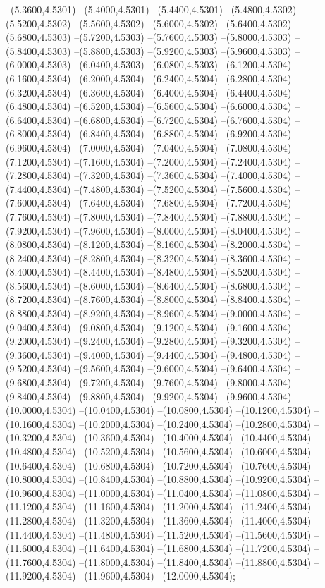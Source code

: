 {	--(5.3600,4.5301)
	--(5.4000,4.5301)
	--(5.4400,4.5301)
	--(5.4800,4.5302)
	--(5.5200,4.5302)
	--(5.5600,4.5302)
	--(5.6000,4.5302)
	--(5.6400,4.5302)
	--(5.6800,4.5303)
	--(5.7200,4.5303)
	--(5.7600,4.5303)
	--(5.8000,4.5303)
	--(5.8400,4.5303)
	--(5.8800,4.5303)
	--(5.9200,4.5303)
	--(5.9600,4.5303)
	--(6.0000,4.5303)
	--(6.0400,4.5303)
	--(6.0800,4.5303)
	--(6.1200,4.5304)
	--(6.1600,4.5304)
	--(6.2000,4.5304)
	--(6.2400,4.5304)
	--(6.2800,4.5304)
	--(6.3200,4.5304)
	--(6.3600,4.5304)
	--(6.4000,4.5304)
	--(6.4400,4.5304)
	--(6.4800,4.5304)
	--(6.5200,4.5304)
	--(6.5600,4.5304)
	--(6.6000,4.5304)
	--(6.6400,4.5304)
	--(6.6800,4.5304)
	--(6.7200,4.5304)
	--(6.7600,4.5304)
	--(6.8000,4.5304)
	--(6.8400,4.5304)
	--(6.8800,4.5304)
	--(6.9200,4.5304)
	--(6.9600,4.5304)
	--(7.0000,4.5304)
	--(7.0400,4.5304)
	--(7.0800,4.5304)
	--(7.1200,4.5304)
	--(7.1600,4.5304)
	--(7.2000,4.5304)
	--(7.2400,4.5304)
	--(7.2800,4.5304)
	--(7.3200,4.5304)
	--(7.3600,4.5304)
	--(7.4000,4.5304)
	--(7.4400,4.5304)
	--(7.4800,4.5304)
	--(7.5200,4.5304)
	--(7.5600,4.5304)
	--(7.6000,4.5304)
	--(7.6400,4.5304)
	--(7.6800,4.5304)
	--(7.7200,4.5304)
	--(7.7600,4.5304)
	--(7.8000,4.5304)
	--(7.8400,4.5304)
	--(7.8800,4.5304)
	--(7.9200,4.5304)
	--(7.9600,4.5304)
	--(8.0000,4.5304)
	--(8.0400,4.5304)
	--(8.0800,4.5304)
	--(8.1200,4.5304)
	--(8.1600,4.5304)
	--(8.2000,4.5304)
	--(8.2400,4.5304)
	--(8.2800,4.5304)
	--(8.3200,4.5304)
	--(8.3600,4.5304)
	--(8.4000,4.5304)
	--(8.4400,4.5304)
	--(8.4800,4.5304)
	--(8.5200,4.5304)
	--(8.5600,4.5304)
	--(8.6000,4.5304)
	--(8.6400,4.5304)
	--(8.6800,4.5304)
	--(8.7200,4.5304)
	--(8.7600,4.5304)
	--(8.8000,4.5304)
	--(8.8400,4.5304)
	--(8.8800,4.5304)
	--(8.9200,4.5304)
	--(8.9600,4.5304)
	--(9.0000,4.5304)
	--(9.0400,4.5304)
	--(9.0800,4.5304)
	--(9.1200,4.5304)
	--(9.1600,4.5304)
	--(9.2000,4.5304)
	--(9.2400,4.5304)
	--(9.2800,4.5304)
	--(9.3200,4.5304)
	--(9.3600,4.5304)
	--(9.4000,4.5304)
	--(9.4400,4.5304)
	--(9.4800,4.5304)
	--(9.5200,4.5304)
	--(9.5600,4.5304)
	--(9.6000,4.5304)
	--(9.6400,4.5304)
	--(9.6800,4.5304)
	--(9.7200,4.5304)
	--(9.7600,4.5304)
	--(9.8000,4.5304)
	--(9.8400,4.5304)
	--(9.8800,4.5304)
	--(9.9200,4.5304)
	--(9.9600,4.5304)
	--(10.0000,4.5304)
	--(10.0400,4.5304)
	--(10.0800,4.5304)
	--(10.1200,4.5304)
	--(10.1600,4.5304)
	--(10.2000,4.5304)
	--(10.2400,4.5304)
	--(10.2800,4.5304)
	--(10.3200,4.5304)
	--(10.3600,4.5304)
	--(10.4000,4.5304)
	--(10.4400,4.5304)
	--(10.4800,4.5304)
	--(10.5200,4.5304)
	--(10.5600,4.5304)
	--(10.6000,4.5304)
	--(10.6400,4.5304)
	--(10.6800,4.5304)
	--(10.7200,4.5304)
	--(10.7600,4.5304)
	--(10.8000,4.5304)
	--(10.8400,4.5304)
	--(10.8800,4.5304)
	--(10.9200,4.5304)
	--(10.9600,4.5304)
	--(11.0000,4.5304)
	--(11.0400,4.5304)
	--(11.0800,4.5304)
	--(11.1200,4.5304)
	--(11.1600,4.5304)
	--(11.2000,4.5304)
	--(11.2400,4.5304)
	--(11.2800,4.5304)
	--(11.3200,4.5304)
	--(11.3600,4.5304)
	--(11.4000,4.5304)
	--(11.4400,4.5304)
	--(11.4800,4.5304)
	--(11.5200,4.5304)
	--(11.5600,4.5304)
	--(11.6000,4.5304)
	--(11.6400,4.5304)
	--(11.6800,4.5304)
	--(11.7200,4.5304)
	--(11.7600,4.5304)
	--(11.8000,4.5304)
	--(11.8400,4.5304)
	--(11.8800,4.5304)
	--(11.9200,4.5304)
	--(11.9600,4.5304)
	--(12.0000,4.5304);
}
